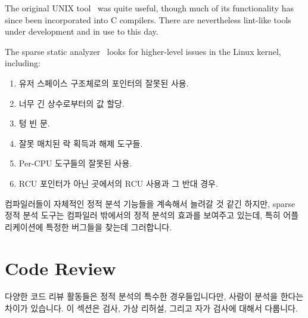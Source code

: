 The original UNIX  tool~\cite{StephenJohnson1977lint} was
quite useful, though much of its functionality has since been incorporated
into C compilers.
There are nevertheless lint-like tools under development and in use to
this day.

The sparse static analyzer~\cite{JonathanCorbet2004sparse}
looks for higher-level issues in the Linux kernel, including:
\fi

\begin{enumerate}
\item	유저 스페이스 구조체로의 포인터의 잘못된 사용.
\item	너무 긴 상수로부터의 값 할당.
\item	텅 빈  문.
\item	잘못 매치된 락 획득과 해제 도구들.
\item	Per-CPU 도구들의 잘못된 사용.
\item	RCU 포인터가 아닌 곳에서의 RCU 사용과 그 반대 경우.

\end{enumerate}

컴파일러들이 자체적인 정적 분석 기능들을 계속해서 늘려갈 것 같긴 하지만, sparse
정적 분석 도구는 컴파일러 밖에서의 정적 분석의 효과를 보여주고 있는데, 특히
어플리케이션에 특정한 버그들을 찾는데 그러합니다.

\section{Code Review}
\label{sec:debugging:Code Review}

다양한 코드 리뷰 활동들은 정적 분석의 특수한 경우들입니다만, 사람이 분석을
한다는 차이가 있습니다.
이 섹션은 검사, 가상 리허설, 그리고 자가 검사에 대해서 다룹니다.
\iffalse

